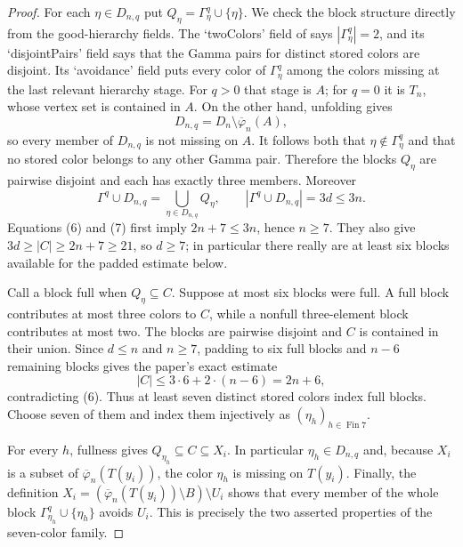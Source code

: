 \begin{proof}
For each $\eta\in D_{n,q}$ put
$Q_\eta=\Gamma^q_\eta\cup\{\eta\}$.  We check the block structure
directly from the good-hierarchy fields.  The `twoColors' field of
 says $|\Gamma^q_\eta|=2$, and its
`disjointPairs' field says that the Gamma pairs for distinct stored colors
are disjoint.  Its `avoidance' field puts every color of
$\Gamma^q_\eta$ among the colors missing at the last relevant hierarchy
stage.  For $q>0$ that stage is $A$; for $q=0$ it is $T_n$, whose vertex
set is contained in $A$.  On the other hand, unfolding
 gives
\[
 D_{n,q}=D_n\setminus\overline\varphi_n(A),
\]
so every member of $D_{n,q}$ is not missing on $A$.  It follows both that
$\eta\notin\Gamma^q_\eta$ and that no stored color belongs to any other
Gamma pair.  Therefore the blocks $Q_\eta$ are pairwise disjoint and each
has exactly three members.  Moreover
\[
 \Gamma^q\cup D_{n,q}=\bigcup_{\eta\in D_{n,q}}Q_\eta,
 \qquad |\Gamma^q\cup D_{n,q}|=3d\le3n.                         \tag{7}
\]
Equations (6) and (7) first imply $2n+7\le3n$, hence $n\ge7$.
They also give $3d\ge |C|\ge2n+7\ge21$, so $d\ge7$; in particular
there really are at least six blocks available for the padded estimate
below.

Call a block full when $Q_\eta\subseteq C$.  Suppose at most six blocks
were full.  A full block contributes at most three colors to $C$, while a
nonfull three-element block contributes at most two.  The blocks are
pairwise disjoint and $C$ is contained in their union.  Since $d\le n$
and $n\ge7$, padding to six full blocks and $n-6$ remaining blocks gives
the paper's exact estimate
\[
             |C|\le 3\cdot6+2\cdot(n-6)=2n+6,
\]
contradicting (6).  Thus at least seven distinct stored colors index full
blocks.  Choose seven of them and index them injectively as
$(\eta_h)_{h\in\operatorname{Fin}7}$.

For every $h$, fullness gives
$Q_{\eta_h}\subseteq C\subseteq X_i$.  In particular
$\eta_h\in D_{n,q}$ and, because $X_i$ is a subset of
$\overline\varphi_n(T(y_i))$, the color $\eta_h$ is missing on
$T(y_i)$.  Finally, the definition
$X_i=(\overline\varphi_n(T(y_i))\setminus B)\setminus U_i$
shows that every member of the whole block
$\Gamma^q_{\eta_h}\cup\{\eta_h\}$ avoids $U_i$.  This is precisely the
two asserted properties of the seven-color family.
\end{proof}
